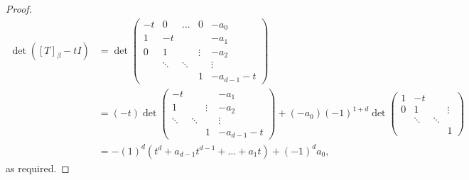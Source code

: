 \documentclass[11pt]{scrartcl}
\begin{document}
\begin{proof}
    \begin{align*}
      \det ([T]_{\beta} -t I) & = 
      \det\begin{pmatrix}
        -t                    & 0      & \dots  & 0      & -a_0   \\
        1                     & -t     &        &        & -a_1   \\
        0                     & 1      &        & \vdots & -a_2   \\
                              & \ddots & \ddots &        & \vdots \\
                              &        &        & 1      & -a_{d-1}-t
               \end{pmatrix}                                      \\
                              & =
      (-t)\det \begin{pmatrix}
        -t                    &        &        & -a_1            \\
        1                     &        & \vdots & -a_2            \\
        \ddots                & \ddots &        & \vdots          \\
                              &        & 1      & -a_{d-1}-t
             \end{pmatrix} + (-a_0)(-1)^{1+d}      \det\begin{pmatrix}
               1              & -t     &        &                 \\
               0              & 1      &        & \vdots          \\
                              & \ddots & \ddots &                 \\
                              &        &        & 1      
               \end{pmatrix}                                      \\
                              & = -(1)^{d}(t^{d}+a_{d-1}t^{d-1}+\dots +a_{1}t) + (-1)^{d}a_{0},
    \end{align*} 
    as required.
  \end{proof}
\end{document}
